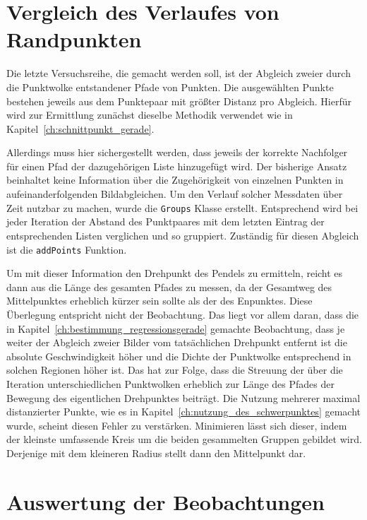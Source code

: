 \section{Vergleich des Verlaufes von Randpunkten}\label{ch:vergleich_verlauf_randpunkte}

Die letzte Versuchsreihe, die gemacht werden soll, ist der Abgleich zweier durch die Punktwolke entstandener Pfade von Punkten.
Die ausgewählten Punkte bestehen jeweils aus dem Punktepaar mit grö{\ss}ter Distanz pro Abgleich.
Hierfür wird zur Ermittlung zunächst dieselbe Methodik verwendet wie in Kapitel~\ref{ch:schnittpunkt_gerade}.

Allerdings muss hier sichergestellt werden, dass jeweils der korrekte Nachfolger für einen Pfad der dazugehörigen Liste hinzugefügt wird.
Der bisherige Ansatz beinhaltet keine Information über die Zugehörigkeit von einzelnen Punkten in aufeinanderfolgenden Bildabgleichen.
Um den Verlauf solcher Messdaten über Zeit nutzbar zu machen, wurde die \lstinline{Groups} Klasse erstellt.
Entsprechend wird bei jeder Iteration der Abstand des Punktpaares mit dem letzten Eintrag der entsprechenden Listen verglichen und so gruppiert.
Zuständig für diesen Abgleich ist die \lstinline{addPoints} Funktion.

Um mit dieser Information den Drehpunkt des Pendels zu ermitteln, reicht es dann aus die Länge des gesamten Pfades zu messen, da der Gesamtweg des Mittelpunktes erheblich kürzer sein sollte als der des Enpunktes.
Diese Überlegung entspricht nicht der Beobachtung.
Das liegt vor allem daran, dass die in Kapitel~\ref{ch:bestimmung_regressionsgerade} gemachte Beobachtung, dass je weiter der Abgleich zweier Bilder vom tatsächlichen Drehpunkt entfernt ist die absolute Geschwindigkeit höher und die Dichte der Punktwolke entsprechend in solchen Regionen höher ist.
Das hat zur Folge, dass die Streuung der über die Iteration unterschiedlichen Punktwolken erheblich zur Länge des Pfades der Bewegung des eigentlichen Drehpunktes beiträgt.
Die Nutzung mehrerer maximal distanzierter Punkte, wie es in Kapitel~\ref{ch:nutzung_des_schwerpunktes} gemacht wurde, scheint diesen Fehler zu verstärken.
Minimieren lässt sich dieser, indem der kleinste umfassende Kreis um die beiden gesammelten Gruppen gebildet wird.
Derjenige mit dem kleineren Radius stellt dann den Mittelpunkt dar.

\section{Auswertung der Beobachtungen}

